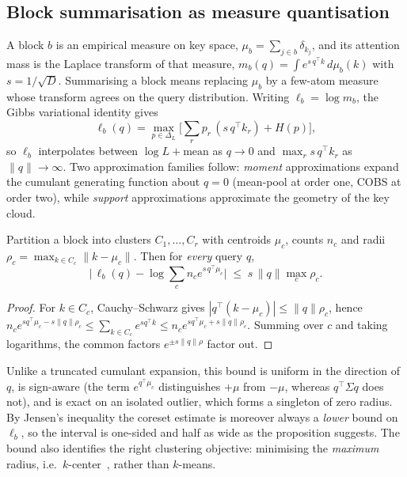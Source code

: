 \documentclass[sigconf,nonacm,11pt]{acmart}
\begin{document}
\subsection{Block summarisation as measure quantisation}

A block $b$ is an empirical measure on key space, $\mu_b=\sum_{j\in b}\delta_{k_j}$,
and its attention mass is the Laplace transform of that measure,
$m_b(q)=\int e^{s\,q^\top k}\,d\mu_b(k)$ with $s=1/\sqrt{D}$. Summarising a block
means replacing $\mu_b$ by a few-atom measure whose transform agrees on the query
distribution. Writing $\ell_b=\log m_b$, the Gibbs variational identity gives
\begin{equation}
\ell_b(q)=\max_{p\in\Delta_L}\Big[\textstyle\sum_r p_r\,(s\,q^\top k_r)+H(p)\Big],
\end{equation}
so $\ell_b$ interpolates between $\log L+\text{mean}$ as $q\to 0$ and
$\max_r s\,q^\top k_r$ as $\|q\|\to\infty$. Two approximation families follow:
\emph{moment} approximations expand the cumulant generating function about $q=0$
(mean-pool at order one, COBS at order two), while \emph{support} approximations
approximate the geometry of the key cloud.

\begin{proposition}\label{prop:bound}
Partition a block into clusters $C_1,\dots,C_r$ with centroids $\mu_c$, counts
$n_c$ and radii $\rho_c=\max_{k\in C_c}\|k-\mu_c\|$. Then for \emph{every} query $q$,
\begin{equation}
\Big|\,\ell_b(q)-\log\textstyle\sum_c n_c e^{s\,q^\top\mu_c}\Big|\;\le\;s\,\|q\|\max_c \rho_c .
\end{equation}
\end{proposition}
\begin{proof}
For $k\in C_c$, Cauchy--Schwarz gives $|q^\top(k-\mu_c)|\le\|q\|\rho_c$, hence
$n_c e^{s q^\top\mu_c-s\|q\|\rho_c}\le\sum_{k\in C_c}e^{s q^\top k}\le
 n_c e^{s q^\top\mu_c+s\|q\|\rho_c}$. Summing over $c$ and taking logarithms, the
common factors $e^{\pm s\|q\|\rho}$ factor out.
\end{proof}

Unlike a truncated cumulant expansion, this bound is uniform in the direction of
$q$, is sign-aware (the term $e^{q^\top\mu_c}$ distinguishes $+\mu$ from $-\mu$,
whereas $q^\top\Sigma q$ does not), and is exact on an isolated outlier, which
forms a singleton of zero radius. By Jensen's inequality the coreset estimate is
moreover always a \emph{lower} bound on $\ell_b$, so the interval is one-sided
and half as wide as the proposition suggests. The bound also identifies the right
clustering objective: minimising the \emph{maximum} radius, i.e.\
$k$-center~\cite{gonzalez1985clustering}, rather than $k$-means.
\end{document}
